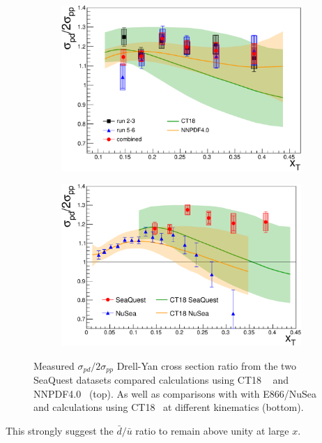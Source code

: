 \documentclass[reprint,aps,unsortedaddress,superscriptaddress,prl,floatfix,showpacs,linenumbers,final]{revtex4-2}
\begin{document}
\begin{figure}[htbp!]
	\captionsetup[subfigure]{labelformat=empty}
	\begin{subfigure}{\linewidth}
		\centering
		\includegraphics[width=\linewidth]{data_full_xT_syst.pdf}	
		\label{subfig:xT_csr_data}
	\end{subfigure}
	\begin{subfigure}{\linewidth}
		\centering
		\includegraphics[width=\linewidth]{E906_E866_xT_CT18only.pdf}
		\label{subfig:xT_csr_exp}
	\end{subfigure}
	\caption{Measured $\sigma_{pd}/2\sigma_{pp}$ Drell-Yan cross section ratio from the two SeaQuest datasets compared calculations using 
		CT18 ~\cite{hou2021} and NNPDF4.0~\cite{ball2022a} (top). As well as comparisons with
		with E866/NuSea~\cite{towell2001} and calculations using CT18~\cite{hou2021} at different kinematics (bottom).}
	\label{fig:xT_csr}
\end{figure}
This strongly suggest the $\bar{d}/\bar{u}$ ratio to remain above unity at large $x$.
\end{document}
